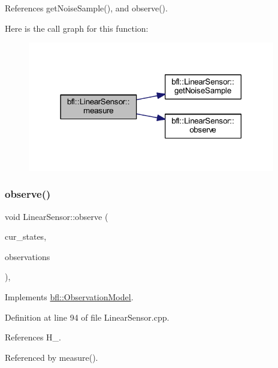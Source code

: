 References get\+Noise\+Sample(), and observe().

Here is the call graph for this function\+:
\nopagebreak
\begin{figure}[H]
\begin{center}
\leavevmode
\includegraphics[width=306pt]{classbfl_1_1LinearSensor_a36f36ae6b935a8c535b553ff6a265f6a_cgraph}
\end{center}
\end{figure}
\mbox{\label{classbfl_1_1LinearSensor_ae53acb6051164c0bcd32d5a6f88e5962}} 
\subsubsection{\texorpdfstring{observe()}{observe()}}
{\footnotesize\ttfamily void Linear\+Sensor\+::observe (\begin{DoxyParamCaption}\item[{const Eigen\+::\+Ref$<$ const Eigen\+::\+Matrix\+Xf $>$ \&}]{cur\+\_\+states,  }\item[{Eigen\+::\+Ref$<$ Eigen\+::\+Matrix\+Xf $>$}]{observations }\end{DoxyParamCaption})\hspace{0.3cm}{\ttfamily [override]}, {\ttfamily [virtual]}}



Implements \mbox{\hyperlink{classbfl_1_1ObservationModel_a2dd06fa6df453e491e1ab73e46f33d18}{bfl\+::\+Observation\+Model}}.



Definition at line 94 of file Linear\+Sensor.\+cpp.



References H\+\_\+.



Referenced by measure().

